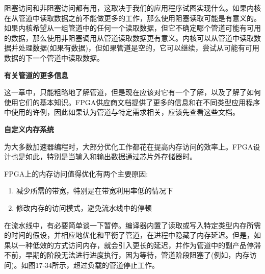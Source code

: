 阻塞访问和非阻塞访问都有用，这取决于我们的应用程序试图实现什么。如果内核在从管道中读取数据之前不能做更多的工作，那么使用阻塞读取可能是有意义的。如果内核希望从一组管道中的任何一个读取数据，但它不确定哪个管道可能有可用的数据，那么使用非阻塞调用从管道读取数据更有意义。内核可以从管道中读取数据并处理数据(如果有数据)，但如果管道是空的，它可以继续，尝试从可能有可用数据的下一个管道中读取数据。\par

\hspace*{\fill} \par %
\textbf{有关管道的更多信息}

这一章中，只能粗略地了解管道，但是现在应该对它有一个了解，以及了解了如何使用它们的基本知识。FPGA供应商文档提供了更多的信息和在不同类型应用程序中使用的许例，因此如果认为管道与特定需求相关，应该先查看这些文档。\par

\hspace*{\fill} \par %
\textbf{自定义内存系统}

为大多数加速器编程时，大部分优化工作都花在提高内存访问的效率上。FPGA设计也是如此，特别是当输入和输出数据通过芯片外存储器时。\par

FPGA上的内存访问值得优化有两个主要原因:\par

\begin{enumerate}
	\item 减少所需的带宽，特别是在带宽利用率低的情况下
	\item 修改内存的访问模式，避免流水线中的停顿
\end{enumerate}

在流水线中，有必要简单谈一下暂停。编译器内置了读取或写入特定类型内存所需的时间的假设，并相应地优化和平衡了管道，在进程中隐藏了内存延迟。但是，如果以一种低效的方式访问内存，就会引入更长的延迟，并作为管道中的副产品停滞不前，早期的阶段无法进行进度执行，因为等待，管道阶段阻塞了(例如，内存访问)。如图17-34所示，超过负载的管道停止工作。\par


